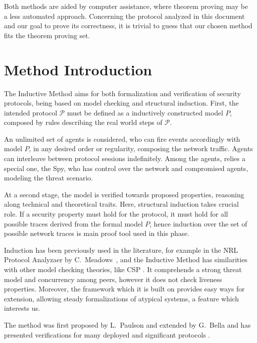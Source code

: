 Both methods are aided by computer assistance, where theorem proving may be a less automated approach. Concerning the protocol analyzed in this document and our goal to prove its correctness, it is trivial to guess that our chosen method fits the theorem proving set.





\section{Method Introduction}
\label{sec:inductive-method}
The Inductive Method aims for both formalization and verification of security protocols, being based on model checking and structural induction. First, the intended protocol $\mathcal{P}$ must be defined as a inductively constructed model $P$, composed by rules describing the real world steps of $\mathcal{P}$.

An unlimited set of agents is considered, who can fire events accordingly with model $P$, in any desired order or regularity, composing the network traffic. Agents can interleave between protocol sessions indefinitely. Among the agents, relies a special one, the Spy, who has control over the network and compromised agents, modeling the threat scenario.

At a second stage, the model is verified towards proposed properties, reasoning along technical and theoretical traits. Here, structural induction takes crucial role. If a security property must hold for the protocol, it must hold for all possible traces derived from the formal model $P$, hence induction over the set of possible network traces is main proof tool used in this phase.

Induction has been previously used in the literature, for example in the NRL Protocol Analyzaer by C.~Meadows~\cite{Meadows96}, and the Inductive Method has similarities with other model checking theories, like CSP \cite{RyanSchneider2010}. It comprehends a strong threat model and concurrency among peers, however it does not check liveness properties. Moreover, the framework which it is built on provides easy ways for extension, allowing steady formalizations of atypical systems, a feature which interests us.

The method was first proposed by L.~Paulson \cite{Paulson98} and extended by G.~Bella \cite{Bella2007} and has presented verifications for many deployed and significant protocols \cite{Paulson99, BellaPaulson2006, Bella2003}.



